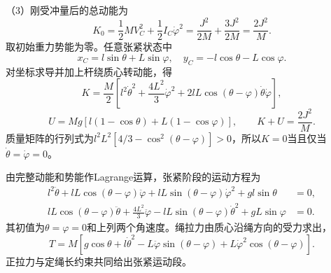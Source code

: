 \documentclass[UTF8,fontset=fandol,a4paper,11pt]{ctexart}
\begin{document}
（3）刚受冲量后的总动能为
\[
K_0=\frac12MV_C^2+\frac12I_C\dot\varphi^2
=\frac{J^2}{2M}+\frac{3J^2}{2M}
=\boxed{\frac{2J^2}{M}}.
\]
取初始重力势能为零。任意张紧状态中
\[
x_C=l\sin\theta+L\sin\varphi,\quad
y_C=-l\cos\theta-L\cos\varphi.
\]
对坐标求导并加上杆绕质心转动能，得
\[
K=\frac M2\left[
l^2\dot\theta^2+\frac{4L^2}{3}\dot\varphi^2
+2lL\cos(\theta-\varphi)\dot\theta\dot\varphi
\right],
\]
\[
U=Mg\left[l(1-\cos\theta)+L(1-\cos\varphi)\right],
\qquad \boxed{K+U=\frac{2J^2}{M}}.
\]
质量矩阵的行列式为$l^2L^2[4/3-\cos^2(\theta-\varphi)]>0$，所以$K=0$当且仅当$\dot\theta=\dot\varphi=0$。


由完整动能和势能作Lagrange运算，张紧阶段的运动方程为
\[
 \begin{aligned}
 l^2\ddot\theta+lL\cos(\theta-\varphi)\ddot\varphi
  +lL\sin(\theta-\varphi)\dot\varphi^2+gl\sin\theta&=0,\\
 lL\cos(\theta-\varphi)\ddot\theta+\frac{4L^2}{3}\ddot\varphi
  -lL\sin(\theta-\varphi)\dot\theta^2+gL\sin\varphi&=0 .
 \end{aligned}
\]
其初值为$\theta=\varphi=0$和上列两个角速度。绳拉力由质心沿绳方向的受力求出，
\[
 T=M\left[g\cos\theta+l\dot\theta^2
 -L\ddot\varphi\sin(\theta-\varphi)
 +L\dot\varphi^2\cos(\theta-\varphi)\right].
\]
正拉力与定绳长约束共同给出张紧运动段。
\end{document}
